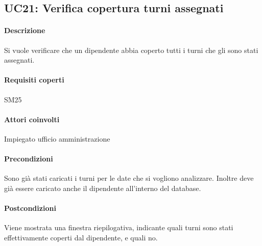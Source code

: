 \subsection{UC21: Verifica copertura turni assegnati}
\paragraph{Descrizione}
Si vuole verificare che un dipendente abbia coperto tutti i turni che gli sono stati assegnati.
\paragraph{Requisiti coperti}
SM25
\paragraph{Attori coinvolti}
Impiegato ufficio amministrazione
\paragraph{Precondizioni}
Sono già stati caricati i turni per le date che si vogliono analizzare. Inoltre deve già essere caricato anche il dipendente all'interno del database.
\paragraph{Postcondizioni}
Viene mostrata una finestra riepilogativa, indicante quali turni sono stati effettivamente coperti dal dipendente, e quali no.
